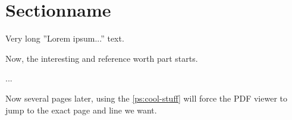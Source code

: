 \usepackage{hyperref}
\section{Sectionname}
\label{sec:s1}

Very long ''Lorem ipsum...'' text.

\label{ps:cool-stuff}
Now, the interesting and reference worth part starts.

...

Now several pages later, using the \ref{ps:cool-stuff} will force the PDF
viewer to jump to the exact page and line we want.
